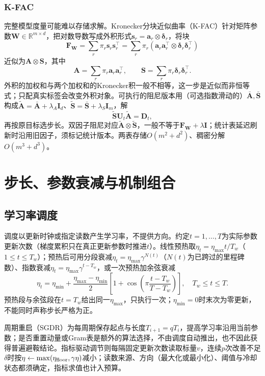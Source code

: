 \subsubsection{K-FAC}

完整模型度量可能难以存储求解。Kronecker分块近似曲率（K-FAC）针对矩阵参数$\bm W\in\mathbb R^{m\times d}$，把对数导数写成外积形式$\bm s_r=\bm a_r\otimes\bm\delta_r$，将块
\[
 \bm F_{\bm W}=\sum_r\pi_r\bm s_r\bm s_r^\top
 =\sum_r\pi_r(\bm a_r\bm a_r^\top\otimes\bm\delta_r\bm\delta_r^\top)
\]
近似为$\bm A\otimes\bm S$，其中
\[
 \bm A=\sum_r\pi_r\bm a_r\bm a_r^\top,\qquad
 \bm S=\sum_r\pi_r\bm\delta_r\bm\delta_r^\top.
\]
外积的加权和与两个加权和的Kronecker积一般不相等，这一步是近似而非恒等式；只配真实标签会改变外积对象。可执行的阻尼版本用（可选指数滑动的）$\bar{\bm A},\bar{\bm S}$构成$\widetilde{\bm A}=\bar{\bm A}+\lambda_A\bm I_d$、$\widetilde{\bm S}=\bar{\bm S}+\lambda_S\bm I_m$，解
\[
 \widetilde{\bm S}\bm U_t\widetilde{\bm A}=\bm D_t,
\]
再按原目标选步长。双因子阻尼对应$\widetilde{\bm A}\otimes\widetilde{\bm S}$，一般不等于$\bm F_{\bm W}+\lambda\bm I$；统计表延迟刷新时沿用旧因子，须标记统计版本。两表存储$O(m^2+d^2)$、稠密分解$O(m^3+d^3)$。

\section{步长、参数衰减与机制组合}

\subsection{学习率调度}

调度以更新时钟或指定读数产生学习率，不提供方向。约定$t=1,\ldots,T$为实际参数更新次数（梯度累积只在真正更新参数时推进$t$）。线性预热取$\eta_t=\eta_{\max}t/T_w$（$1\leq t\leq T_w$）；预热后可用分段衰减$\eta_t=\eta_{\max}\gamma^{N(t)}$（$N(t)$为已跨过的里程碑数）、指数衰减$\eta_t=\eta_{\max}\gamma^{t-T_w}$，或一次预热加余弦衰减
\[
 \eta_t=\eta_{\min}+\frac{\eta_{\max}-\eta_{\min}}2
 \left[1+\cos\!\left(\pi\frac{t-T_w}{T-T_w}\right)\right],
 \quad T_w\leq t\leq T.
\]
预热段与余弦段在$t=T_w$给出同一$\eta_{\max}$，只执行一次；$\eta_{\min}=0$时末次为零更新，不能同时声称步长严格为正。

周期重启（SGDR）为每周期保存起点与长度$T_{i+1}=qT_i$，提高学习率沿用当前参数；是否重置动量或Gram表是额外的算法选择，不由调度自动推出，也不因此获得普遍避鞍结论。指标驱动调节则每隔固定更新次数读取标量$v$，连续$p$次改善不足$\delta$时按$\eta\leftarrow\max(\eta_{\rm floor},\gamma\eta)$减小；读数来源、方向（最大化或最小化）、阈值与冷却状态都须确定，指标求值也计入预算。

